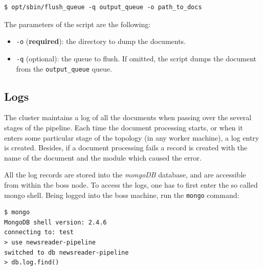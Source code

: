 \documentclass[a4]{article}
\begin{document}
\begin{verbatim}
$ opt/sbin/flush_queue -q output_queue -o path_to_docs
\end{verbatim}

The parameters of the script are the following:
\begin{itemize}
\item \texttt{-o} (\textbf{required}): the directory to dump the documents.
\item \texttt{-q} (optional): the queue to flush. If omitted, the script
  dumps the document from the \texttt{output\_queue} queue.
\end{itemize}

\subsection*{Logs}
\label{sec:logs}

The cluster maintains a log of all the documents when passing over the
several stages of the pipeline. Each time the document processing starts, or
when it enters some particular stage of the topology (in any worker
machine), a log entry is created. Besides, if a document processing fails a
record is created with the name of the document and the module which caused
the error.

All the log records are stored into the \emph{mongoDB} database, and are
accessible from within the boss node. To access the logs, one has to first
enter the so called mongo shell. Being logged into the boss machine, run the
\texttt{mongo} command:

\begin{verbatim}
$ mongo
MongoDB shell version: 2.4.6
connecting to: test
> use newsreader-pipeline
switched to db newsreader-pipeline
> db.log.find()
\end{verbatim}
\end{document}
